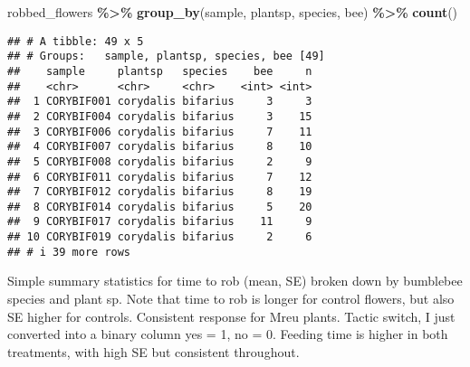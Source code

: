 \documentclass[
]{article}
\newenvironment{Shaded}{\begin{snugshade}}{\end{snugshade}}
\newcommand{\FunctionTok}[1]{\textcolor[rgb]{0.13,0.29,0.53}{\textbf{#1}}}
\newcommand{\NormalTok}[1]{#1}
\newcommand{\SpecialCharTok}[1]{\textcolor[rgb]{0.81,0.36,0.00}{\textbf{#1}}}
\begin{document}
\begin{Shaded}
\begin{Highlighting}[]
\NormalTok{robbed\_flowers }\SpecialCharTok{\%\textgreater{}\%} \FunctionTok{group\_by}\NormalTok{(sample, plantsp, species, bee) }\SpecialCharTok{\%\textgreater{}\%} \FunctionTok{count}\NormalTok{()}
\end{Highlighting}
\end{Shaded}

\begin{verbatim}
## # A tibble: 49 x 5
## # Groups:   sample, plantsp, species, bee [49]
##    sample     plantsp   species    bee     n
##    <chr>      <chr>     <chr>    <int> <int>
##  1 CORYBIF001 corydalis bifarius     3     3
##  2 CORYBIF004 corydalis bifarius     3    15
##  3 CORYBIF006 corydalis bifarius     7    11
##  4 CORYBIF007 corydalis bifarius     8    10
##  5 CORYBIF008 corydalis bifarius     2     9
##  6 CORYBIF011 corydalis bifarius     7    12
##  7 CORYBIF012 corydalis bifarius     8    19
##  8 CORYBIF014 corydalis bifarius     5    20
##  9 CORYBIF017 corydalis bifarius    11     9
## 10 CORYBIF019 corydalis bifarius     2     6
## # i 39 more rows
\end{verbatim}

Simple summary statistics for time to rob (mean, SE) broken down by
bumblebee species and plant sp. Note that time to rob is longer for
control flowers, but also SE higher for controls. Consistent response
for Mreu plants. Tactic switch, I just converted into a binary column
yes = 1, no = 0. Feeding time is higher in both treatments, with high SE
but consistent throughout.
\end{document}
